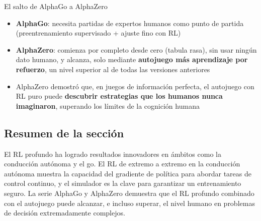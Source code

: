 \begin{importantbox}{El salto de AlphaGo a AlphaZero}
\begin{itemize}
    \item \textbf{AlphaGo}: necesita partidas de expertos humanos como punto de partida (preentrenamiento supervisado + ajuste fino con RL)
    \item \textbf{AlphaZero}: comienza por completo desde cero (tabula rasa), sin usar ningún dato humano, y alcanza, solo mediante \textbf{autojuego más aprendizaje por refuerzo}, un nivel superior al de todas las versiones anteriores
    \item AlphaZero demostró que, en juegos de información perfecta, el autojuego con RL puro puede \textbf{descubrir estrategias que los humanos nunca imaginaron}, superando los límites de la cognición humana
\end{itemize}
\end{importantbox}

\subsection{Resumen de la sección}

El RL profundo ha logrado resultados innovadores en ámbitos como la conducción autónoma y el go. El RL de extremo a extremo en la conducción autónoma muestra la capacidad del gradiente de política para abordar tareas de control continuo, y el simulador es la clave para garantizar un entrenamiento seguro. La serie AlphaGo y AlphaZero demuestra que el RL profundo combinado con el autojuego puede alcanzar, e incluso superar, el nivel humano en problemas de decisión extremadamente complejos.

